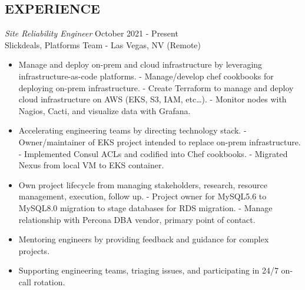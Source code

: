 \documentclass[line,margin]{res}
\begin{document}
\address{Phone: +1.650.772.1711 $|$ Email: alan.huang.250r@gmail.com}

\begin{resume}

\section{EXPERIENCE}
\vspace{25px}
\begin{adjustwidth}{-115pt}{0pt}
	{\sl Site Reliability Engineer}
		\hfill October 2021 - Present\\
		Slickdeals, Platforms Team - Las Vegas, NV (Remote)
		\begin{itemize}
			\item Manage and deploy on-prem and cloud infrastructure by leveraging infrastructure-as-code platforms.
				\subitem - Manage/develop chef cookbooks for deploying on-prem infrastructure.
				\subitem - Create Terraform to manage and deploy cloud infrastructure on AWS (EKS, S3, IAM, etc…).
				\subitem - Monitor nodes with Nagios, Cacti, and visualize data with Grafana.
			\item Accelerating engineering teams by directing technology stack.
				\subitem - Owner/maintainer of EKS project intended to replace on-prem infrastructure.
				\subitem - Implemented Consul ACLs and codified into Chef cookbooks.
				\subitem - Migrated Nexus from local VM to EKS container.
			\item Own project lifecycle from managing stakeholders, research, resource management, execution, follow up.
				\subitem - Project owner for MySQL5.6 to MySQL8.0 migration to stage databases for RDS migration.
				\subitem - Manage relationship with Percona DBA vendor, primary point of contact.
			\item Mentoring engineers by providing feedback and guidance for complex projects.
			\item Supporting engineering teams, triaging issues, and participating in 24/7 on-call rotation.


\end{itemize}
\end{adjustwidth}
\end{resume}
\end{document}
